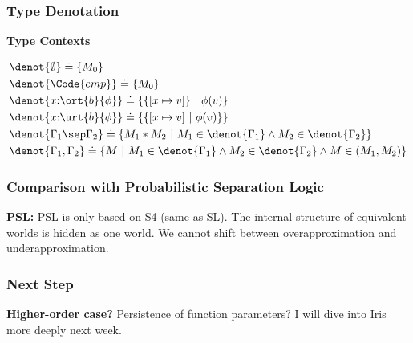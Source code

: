 \begin{frame}[fragile]
    \frametitle{Type Denotation}

\textbf{Type Contexts}

\begin{align*}
    &\denot{\emptyset} \doteq \{M_0\} \\
    &\denot{\Code{emp}} \doteq \{M_0\} \\
    &\denot{x{:}\ort{b}{\phi}} \doteq \{ \{[x\mapsto v]\} ~|~ \phi(v) \} \\
    &\denot{x{:}\urt{b}{\phi}} \doteq \{ \{[x\mapsto v] ~|~ \phi(v) \} \} \\
    &\denot{\Gamma_1 \sep \Gamma_2} \doteq \{ M_1 * M_2 ~|~ M_1 \in \denot{\Gamma_1} \land M_2 \in \denot{\Gamma_2} \} \\
    &\denot{\Gamma_1 , \Gamma_2} \doteq \{ M ~|~ M_1 \in \denot{\Gamma_1} \land M_2 \in \denot{\Gamma_2} \land M \in (M_1 , M_2) \} \\
\end{align*}

\end{frame}

\begin{frame}[fragile]
    \frametitle{Comparison with Probabilistic Separation Logic}

\textbf{PSL:} PSL is only based on S4 (same as SL). The internal structure of equivalent worlds is hidden as one world. We cannot shift between overapproximation and underapproximation.

\end{frame}

\begin{frame}[fragile]
    \frametitle{Next Step}

\textbf{Higher-order case?} Persistence of function parameters? I will dive into Iris more deeply next week.

\end{frame}